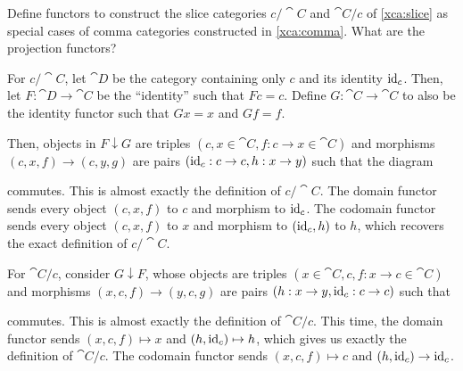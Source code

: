 \documentclass[notes,tikz]{agony}
\renewcommand{\C}{\cat{C}}
\newcommand{\D}{\cat{D}}
\newcommand{\comma}{\mathbin{\downarrow}}
\begin{document}
\begin{xca}
  Define functors to construct the slice categories $c/\C$ and $\C/c$ of \cref{xca:slice}
  as special cases of comma categories constructed in \cref{xca:comma}.
  What are the projection functors?
\end{xca}
\begin{sol}
  For $c/\C$, let $\D$ be the category containing only $c$ and its identity $\operatorname{id}_c$.
  Then, let $F : \D \to \C$ be the ``identity'' such that $Fc = c$.
  Define $G : \C \to \C$ to also be the identity functor such that $Gx = x$ and $Gf = f$.

  Then, objects in $F \comma G$ are triples $(c, x \in \C, f : c \to x \in \C)$
  and morphisms $(c,x,f) \to (c,y,g)$ are pairs $(\operatorname{id}_c : c \to c, h : x \to y)$
  such that the diagram
  \begin{center}
  \end{center}
  commutes.
  This is almost exactly the definition of $c/\C$.
  The domain functor sends every object $(c,x,f)$ to $c$ and morphism to $\operatorname{id}_c$.
  The codomain functor sends every object $(c,x,f)$ to $x$
  and morphism to $(\operatorname{id}_c,h)$ to $h$,
  which recovers the exact definition of $c/\C$.

  For $\C/c$, consider $G \comma F$, whose objects are triples $(x \in \C, c, f : x \to c \in \C)$
  and morphisms $(x,c,f) \to (y,c,g)$ are pairs $(h : x \to y, \operatorname{id}_c : c \to c)$ such that
  \begin{center}
  \end{center}
  commutes.
  This is almost exactly the definition of $\C/c$.
  This time, the domain functor sends $(x,c,f) \mapsto x$ and $(h,\operatorname{id}_c) \mapsto h$,
  which gives us exactly the definition of $\C/c$.
  The codomain functor sends $(x,c,f) \mapsto c$ and $(h,\operatorname{id}_c) \to \operatorname{id}_c$.
\end{sol}
\end{document}
